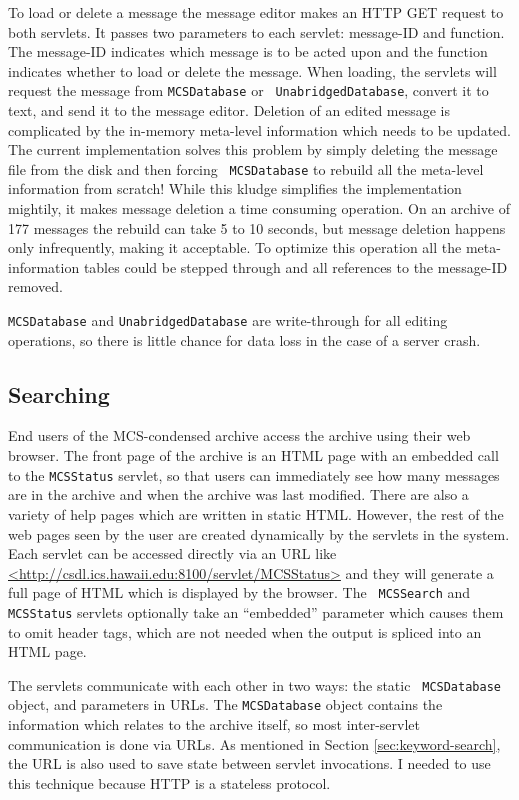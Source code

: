 To load or delete a message the message editor makes an HTTP GET request to
both servlets. It passes two parameters to each servlet: message-ID and
function.  The message-ID indicates which message is to be acted upon and the
function indicates whether to load or delete the message. When loading, the
servlets will request the message from {\tt MCSDatabase} or {\tt
  UnabridgedDatabase}, convert it to text, and send it to the message editor.
Deletion of an edited message is complicated by the in-memory meta-level
information which needs to be updated. The current implementation solves this
problem by simply deleting the message file from the disk and then forcing {\tt
  MCSDatabase} to rebuild all the meta-level information from scratch! While
this kludge simplifies the implementation mightily, it makes message deletion a
time consuming operation.  On an archive of 177 messages the rebuild can take 5
to 10 seconds, but message deletion happens only infrequently, making it
acceptable. To optimize this operation all the meta-information tables could be
stepped through and all references to the message-ID removed.

{\tt MCSDatabase} and {\tt UnabridgedDatabase} are write-through for all
editing operations, so there is little chance for data loss in the case of a
server crash.

\subsection{Searching}
End users of the MCS-condensed archive access the archive using their web
browser. The front page of the archive is an HTML page with an embedded call to
the {\tt MCSStatus} servlet, so that users can immediately see how many
messages are in the archive and when the archive was last modified. There are
also a variety of help pages which are written in static HTML. However, the
rest of the web pages seen by the user are created dynamically by the servlets
in the system. Each servlet can be accessed directly via an URL like
\url{<http://csdl.ics.hawaii.edu:8100/servlet/MCSStatus>} and they will
generate a full page of HTML which is displayed by the browser. The {\tt
  MCSSearch} and {\tt MCSStatus} servlets optionally take an ``embedded''
parameter which causes them to omit header tags, which are not needed when the
output is spliced into an HTML page.

The servlets communicate with each other in two ways: the static {\tt
  MCSDatabase} object, and parameters in URLs. The {\tt MCSDatabase} object
contains the information which relates to the archive itself, so most
inter-servlet communication is done via URLs. As mentioned in Section
\ref{sec:keyword-search}, the URL is also used to save state between servlet
invocations. I needed to use this technique because HTTP is a stateless
protocol.

